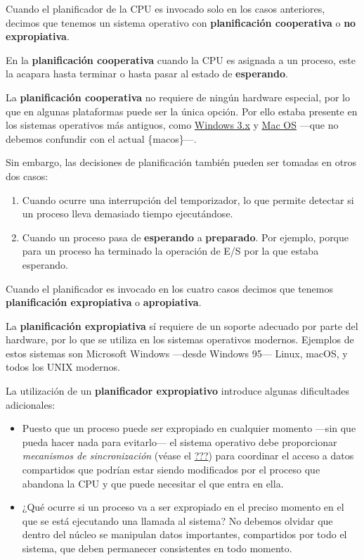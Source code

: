 Cuando el planificador de la CPU es invocado solo en los casos
anteriores, decimos que tenemos un sistema operativo con
\textbf{planificación cooperativa}{} o \textbf{no expropiativa}{}.

En la \textbf{planificación cooperativa} cuando la CPU es asignada a un
proceso, este la acapara hasta terminar o hasta pasar al estado de
\textbf{esperando}.

La \textbf{planificación cooperativa} no requiere de ningún hardware
especial, por lo que en algunas plataformas puede ser la única opción.
Por ello estaba presente en los sistemas operativos más antiguos, como
\href{https://es.wikipedia.org/wiki/Windows_3.1x}{Windows 3.x} y
\href{https://es.wikipedia.org/wiki/Mac_OS}{Mac OS} ---que no debemos
confundir con el actual \{macos\}---.

Sin embargo, las decisiones de planificación también pueden ser tomadas
en otros dos casos:

\begin{enumerate}
\def\labelenumi{\arabic{enumi}.}
\item
  Cuando ocurre una interrupción del temporizador, lo que permite
  detectar si un proceso lleva demasiado tiempo ejecutándose.
\item
  Cuando un proceso pasa de \textbf{esperando} a \textbf{preparado}. Por
  ejemplo, porque para un proceso ha terminado la operación de E/S por
  la que estaba esperando.
\end{enumerate}

Cuando el planificador es invocado en los cuatro casos decimos que
tenemos \textbf{planificación expropiativa}{} o \textbf{apropiativa}{}.

La \textbf{planificación expropiativa} sí requiere de un soporte
adecuado por parte del hardware, por lo que se utiliza en los sistemas
operativos modernos. Ejemplos de estos sistemas son Microsoft Windows
---desde Windows 95--- Linux, macOS, y todos los UNIX modernos.

La utilización de un \textbf{planificador expropiativo} introduce
algunas dificultades adicionales:

\begin{itemize}
\item
  Puesto que un proceso puede ser expropiado en cualquier momento ---sin
  que pueda hacer nada para evitarlo--- el sistema operativo debe
  proporcionar \emph{mecanismos de sincronización} (véase el
  \hyperref[sincronizaciuxf3n]{???}) para coordinar el acceso a datos
  compartidos que podrían estar siendo modificados por el proceso que
  abandona la CPU y que puede necesitar el que entra en ella.
\item
  ¿Qué ocurre si un proceso va a ser expropiado en el preciso momento en
  el que se está ejecutando una llamada al sistema? No debemos olvidar
  que dentro del núcleo se manipulan datos importantes, compartidos por
  todo el sistema, que deben permanecer consistentes en todo momento.
\end{itemize}

